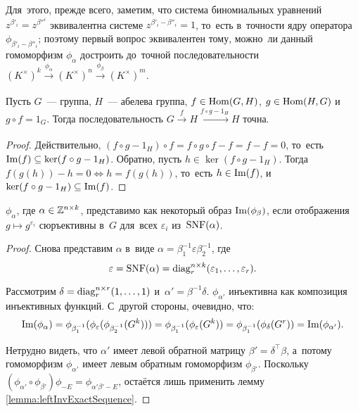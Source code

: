 \documentclass[a4paper,oneside]{article}
\begin{document}
Для~этого, прежде всего, заметим, что система биномиальных уравнений $z^{\beta'_i} = z^{\beta''^i}$ эквивалентна
системе $z^{\beta'_i - \beta''_i} = 1$, то~есть в~точности ядру оператора $\phi_{\beta'_i - \beta''_i}$;
поэтому первый вопрос эквивалентен тому, можно~ли данный гомоморфизм $\phi_\alpha$ достроить
до~точной последовательности $(K^\times)^k \xrightarrow[]{\phi_\alpha} (K^\times)^n \xrightarrow[]{\phi_\beta} (K^\times)^m$.

\begin{lemma}
\label{lemma:leftInvExactSequence}
  Пусть $G$~— группа, $H$~— абелева группа, $f \in \mathrm{Hom}(G, H)$, $g \in \mathrm{Hom}(H, G)$ и~$g \circ f = 1_G$.
  Тогда последовательность $G \xrightarrow[]{f} H \xrightarrow[]{f \circ g - 1_H} H$ точна.
\end{lemma}

\begin{proof}
  Действительно, $(f \circ g - 1_H) \circ f = f \circ g \circ f - f = f - f = 0$, то~есть $\mathrm{Im}(f) \subseteq \ker(f \circ g - 1_H)$. 
  Обратно, пусть $h \in \ker(f \circ g - 1_H)$. Тогда $f(g(h)) - h = 0 \Leftrightarrow h = f(g(h))$, то~есть $h \in \mathrm{Im}(f)$,
  и~$\ker(f \circ g - 1_H) \subseteq \mathrm{Im}(f)$.
\end{proof}

\begin{lemma}
  $\phi_\alpha$, где $\alpha \in \mathbb{Z}^{n \times k}$, представимо как некоторый образ $\mathrm{Im}(\phi_\beta)$,
  если отображения $g \mapsto g^{\varepsilon_i}$ сюръективны в~$G$ для~всех $\varepsilon_i$ из~$\mathrm{SNF}(\alpha)$.
\end{lemma}

\begin{proof}
  Снова представим $\alpha$ в~виде $\alpha = \beta_1^{-1} \varepsilon \beta_2^{-1}$, где
  \[
    \varepsilon = \mathrm{SNF}(\alpha) = \mathrm{diag}^{n \times k}_r(\varepsilon_1, \ldots, \varepsilon_r).
  \]

  Рассмотрим $\delta = \mathrm{diag}^{n \times r}_r(1, \ldots, 1)$ и~$\alpha' = \beta^{-1} \delta$.
  $\phi_{\alpha'}$ инъективна как композиция инъективных функций. С~другой стороны, очевидно, что:
  \[
    \mathrm{Im}(\phi_\alpha) = \phi_{\beta_1^{-1}} (\phi_\varepsilon (\phi_{\beta_2^{-1}} (G^k)))
                        = \phi_{\beta_1^{-1}} (\phi_\varepsilon (G^k))
                        = \phi_{\beta_1^{-1}} (\phi_{\delta} (G^r))
                        = \mathrm{Im}(\phi_{\alpha'}).
  \]

  Нетрудно видеть, что $\alpha'$ имеет левой обратной матрицу $\beta' = \delta^{\top} \beta$,
  а~потому гомоморфизм $\phi_{\alpha'}$ имеет левым обратным гомоморфизм $\phi_{\beta'}$.
  Поскольку $(\phi_{\alpha'} \circ \phi_{\beta'}) \phi_{-E} = \phi_{\alpha' \beta' - E}$, остаётся лишь применить лемму \ref{lemma:leftInvExactSequence}.
\end{proof}
\end{document}
